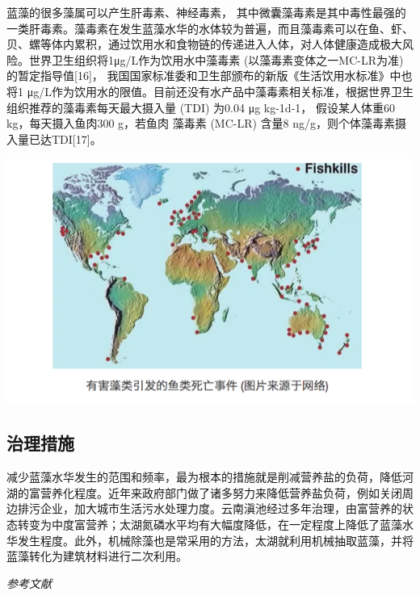 \documentclass[]{book}
\begin{document}
蓝藻的很多藻属可以产生肝毒素、神经毒素， 其中微囊藻毒素是其中毒性最强的一类肝毒素。藻毒素在发生蓝藻水华的水体较为普遍，而且藻毒素可以在鱼、虾、贝、螺等体内累积，通过饮用水和食物链的传递进入人体，对人体健康造成极大风险。世界卫生组织将1μg/L作为饮用水中藻毒素 (以藻毒素变体之一MC-LR为准) 的暂定指导值{[}16{]}， 我国国家标准委和卫生部颁布的新版《生活饮用水标准》中也将1 μg/L作为饮用水的限值。目前还没有水产品中藻毒素相关标准，根据世界卫生组织推荐的藻毒素每天最大摄入量 (TDI) 为0.04 μg kg-1d-1， 假设某人体重60 kg，每天摄入鱼肉300 g，若鱼肉 藻毒素 (MC-LR) 含量8 ng/g，则个体藻毒素摄入量已达TDI{[}17{]}。

\includegraphics[width=8.33in]{images/lanzao3}

\hypertarget{ux6cbbux7406ux63aaux65bd}{%
\subsection{治理措施}\label{ux6cbbux7406ux63aaux65bd}}

减少蓝藻水华发生的范围和频率，最为根本的措施就是削减营养盐的负荷，降低河湖的富营养化程度。近年来政府部门做了诸多努力来降低营养盐负荷，例如关闭周边排污企业，加大城市生活污水处理力度。云南滇池经过多年治理，由富营养的状态转变为中度富营养；太湖氮磷水平均有大幅度降低，在一定程度上降低了蓝藻水华发生程度。此外，机械除藻也是常采用的方法，太湖就利用机械抽取蓝藻，并将蓝藻转化为建筑材料进行二次利用。

\emph{参考文献}
\end{document}
